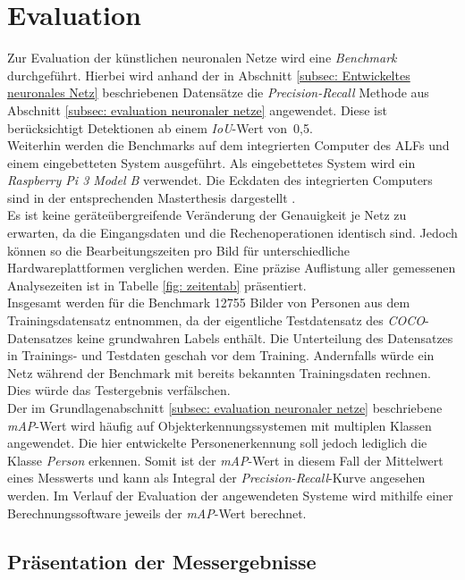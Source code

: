 \chapter{Evaluation}
\label{ch: Verifikation}
Zur Evaluation der künstlichen neuronalen Netze wird eine \textit{Benchmark} durchgeführt. Hierbei wird anhand der in Abschnitt \ref{subsec: Entwickeltes neuronales Netz} beschriebenen Datensätze die \textit{Precision-Recall} Methode aus Abschnitt \ref{subsec: evaluation neuronaler netze} angewendet. Diese ist berücksichtigt Detektionen ab einem \textit{IoU}-Wert von~0,5.\\

 Weiterhin werden die Benchmarks auf dem integrierten Computer des ALFs und einem eingebetteten System ausgeführt. Als eingebettetes System wird ein \textit{Raspberry Pi 3 Model B} verwendet. Die Eckdaten des integrierten Computers sind in der entsprechenden Masterthesis dargestellt \cite{alf}.\\

Es ist keine geräteübergreifende Veränderung der Genauigkeit je Netz zu erwarten, da die Eingangsdaten und die Rechenoperationen identisch sind. Jedoch können so die Bearbeitungszeiten pro Bild für unterschiedliche Hardwareplattformen verglichen werden. Eine präzise Auflistung aller gemessenen Analysezeiten ist in Tabelle \ref{fig: zeitentab} präsentiert. \\

Insgesamt werden für die Benchmark 12755 Bilder von Personen aus dem Trainingsdatensatz entnommen, da der eigentliche Testdatensatz des \textit{COCO}-Datensatzes keine grundwahren Labels enthält. Die Unterteilung des Datensatzes in Trainings- und Testdaten geschah vor dem Training. Andernfalls würde ein Netz während der Benchmark mit bereits bekannten Trainingsdaten rechnen. Dies würde das Testergebnis verfälschen. \\
 

Der im Grundlagenabschnitt \ref{subsec: evaluation neuronaler netze} beschriebene \textit{mAP}-Wert wird häufig auf Objekterkennungssystemen mit multiplen Klassen angewendet. Die hier entwickelte Personenerkennung soll jedoch lediglich die Klasse \textit{Person} erkennen. Somit ist der \textit{mAP}-Wert in diesem Fall der Mittelwert eines Messwerts und kann als Integral der \textit{Precision-Recall}-Kurve angesehen werden. Im Verlauf der Evaluation der angewendeten Systeme wird mithilfe einer Berechnungssoftware jeweils der \textit{mAP}-Wert berechnet.
 
\section{Präsentation der Messergebnisse} 

